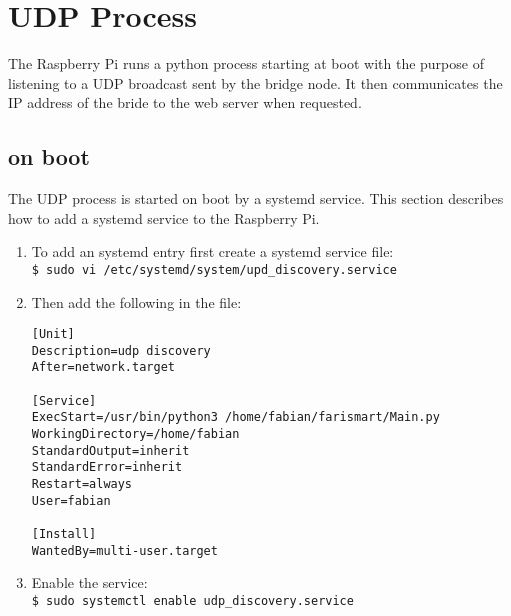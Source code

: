 \section{UDP Process}
The Raspberry Pi runs a python process starting at boot with
the purpose of listening to a UDP broadcast sent by the bridge
node. It then communicates the IP address of the bride to the
web server when requested.

    \subsection{on boot}
    The UDP process is started on boot by a systemd service.
    This section describes how to add a systemd service to the
    Raspberry Pi.

    \begin{enumerate}
        \item To add an systemd entry first create a systemd service file: \\
        \texttt{\$ sudo vi /etc/systemd/system/upd\_discovery.service}

        \item Then add the following in the file:
        \begin{lstlisting}[style=cppCode]
[Unit]
Description=udp discovery
After=network.target

[Service]
ExecStart=/usr/bin/python3 /home/fabian/farismart/Main.py
WorkingDirectory=/home/fabian
StandardOutput=inherit
StandardError=inherit
Restart=always
User=fabian

[Install]
WantedBy=multi-user.target
        \end{lstlisting}

        \item Enable the service: \\
        \texttt{\$ sudo systemctl enable udp\_discovery.service}
    \end{enumerate}
    